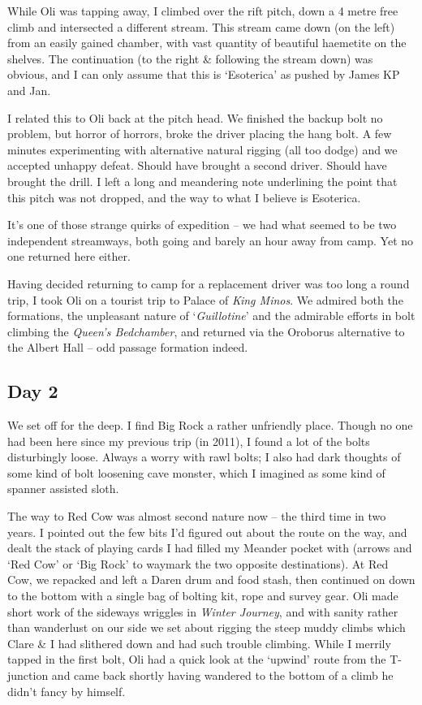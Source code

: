While Oli was tapping away, I climbed over the rift pitch, down a 4
metre free climb and intersected a different stream. This stream came
down (on the left) from an easily gained chamber, with vast quantity of
beautiful haemetite on the shelves. The continuation (to the right \&
following the stream down) was obvious, and I can only assume that this
is `Esoterica' as pushed by James KP and Jan.

I related this to Oli back at the pitch head. We finished the backup
bolt no problem, but horror of horrors, broke the driver placing the
hang bolt. A few minutes experimenting with alternative natural rigging
(all too dodge) and we accepted unhappy defeat. Should have brought a
second driver. Should have brought the drill. I left a long and
meandering note underlining the point that this pitch was not dropped,
and the way to what I believe is Esoterica.

It's one of those strange quirks of expedition -- we had what seemed to
be two independent streamways, both going and barely an hour away from
camp. Yet no one returned here either.

Having decided returning to camp for a replacement driver was too long a
round trip, I took Oli on a tourist trip to Palace of \emph{King Minos}.
We admired both the formations, the unpleasant nature of
`\emph{Guillotine}' and the admirable efforts in bolt climbing the
\emph{Queen's Bedchamber}, and returned via the Oroborus alternative to
the Albert Hall -- odd passage formation indeed.

\hypertarget{day-2}{%
\subsection{Day 2}\label{day-2}}

We set off for the deep. I find Big Rock a rather unfriendly place.
Though no one had been here since my previous trip (in 2011), I found a
lot of the bolts disturbingly loose. Always a worry with rawl bolts; I
also had dark thoughts of some kind of bolt loosening cave monster,
which I imagined as some kind of spanner assisted sloth.

The way to Red Cow was almost second nature now -- the third time in two
years. I pointed out the few bits I'd figured out about the route on the
way, and dealt the stack of playing cards I had filled my Meander pocket
with (arrows and `Red Cow' or `Big Rock' to waymark the two opposite
destinations). At Red Cow, we repacked and left a Daren drum and food
stash, then continued on down to the bottom with a single bag of bolting
kit, rope and survey gear. Oli made short work of the sideways wriggles
in \emph{Winter Journey}, and with sanity rather than wanderlust on our
side we set about rigging the steep muddy climbs which Clare \& I had
slithered down and had such trouble climbing. While I merrily tapped in
the first bolt, Oli had a quick look at the `upwind' route from the
T-junction and came back shortly having wandered to the bottom of a
climb he didn't fancy by himself.

